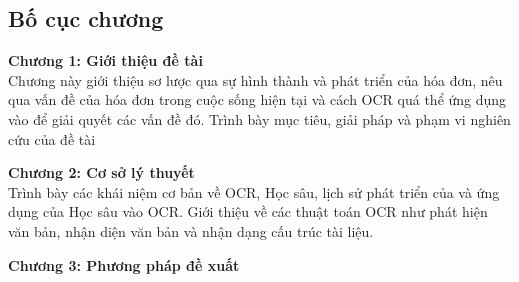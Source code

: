 \subsection{Bố cục chương}
\textbf{Chương 1: Giới thiệu đề tài} \\Chương này giới thiệu sơ lược qua sự hình thành và phát triển của hóa đơn, nêu qua vấn đề của hóa đơn trong cuộc sống hiện tại và cách OCR quá thể ứng dụng vào để giải quyết các vấn đề đó. Trình bày mục tiêu, giải pháp và phạm vi nghiên cứu của đề tài 

\textbf{Chương 2: Cơ sở lý thuyết} \\Trình bày các khái niệm cơ bản về OCR, Học sâu, lịch sử phát triển của và ứng dụng của Học sâu vào OCR. Giới thiệu về các thuật toán OCR như phát hiện văn bản, nhận diện văn bản và nhận dạng cấu trúc tài liệu.

\textbf{Chương 3: Phương pháp đề xuất}

